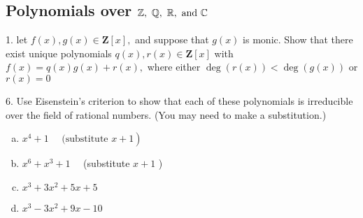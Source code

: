 \subsection{Polynomials over $\mathbb{Z},\ \mathbb{Q},\ \mathbb{R},\text{ and } \mathbb{C}$}
\begin{mdframed}[style=darkQuesion]
  1. let $f(x), g(x) \in \mathbf{Z}[x],$ and suppose that $g(x)$ is monic. Show that there exist unique polynomials $q(x), r(x) \in \mathbf{Z}[x]$ with $f(x)=q(x) g(x)+r(x),$ where either $\operatorname{deg}(r(x))<\operatorname{deg}(g(x))$ or $r(x)=0$
\end{mdframed}
\begin{mdframed}[style=darkAnswer,frametitle={Joe Starr}]
\end{mdframed}
\newpage
\begin{mdframed}[style=darkQuesion]
  6. Use Eisenstein's criterion to show that each of these polynomials is irreducible over the field of rational numbers. (You may need to make a substitution.)
  \begin{enumerate}[(a)]
\item{$\left.x^{4}+1 \quad \text { (substitute } x+1\right)$}
\item{$x^{6}+x^{3}+1 \quad$ (substitute $x+1$ )}
\item{$ x^{3}+3 x^{2}+5 x+5$}
\item{$x^{3}-3 x^{2}+9 x-10$}
\end{enumerate} 
\end{mdframed}
\begin{mdframed}[style=darkAnswer,frametitle={Joe Starr}]
\end{mdframed}
\newpage

